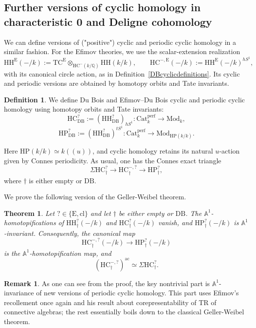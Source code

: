 \documentclass{amsart}
\theoremstyle{plain}
\newtheorem{theorem}[prop]{Theorem}
\theoremstyle{definition}
\newtheorem{defi}[prop]{Definition}
\newtheorem{remark}[prop]{Remark}
\newcommand{\bbA}{\mathbb{A}}
\newcommand{\bbQ}{\mathbb{Q}}
\newcommand{\Catperf}{\mathrm{Cat}^{\mathrm{perf}}}
\newcommand{\TC}{\mathrm{TC}}
\newcommand{\HH}{\mathrm{HH}}
\newcommand{\HC}{\mathrm{HC}}
\newcommand{\HP}{\mathrm{HP}}
\newcommand{\Mod}{\mathrm{Mod}}
\newcommand{\DB}{\mathrm{DB}}
\newcommand{\cl}{\mathrm{cl}}
\begin{document}
\subsection{Further versions of cyclic homology in characteristic 0 and Deligne cohomology}\label{seccyclicDeligne}

We can define versions of ("positive") cyclic and periodic cyclic homology in a similar fashion.
For the Efimov theories, we use the scalar-extension realization
\[
\HH^{\mathrm{E}}(-/k):=\TC^{\mathrm{E}}\otimes_{\HC^-(k/\bbQ)}\HH(k/k),
\qquad \HC^{-,\mathrm{E}}(-/k):=\HH^{\mathrm{E}}(-/k)^{hS^1},
\]
with its canonical circle action, as in Definition~\ref{DBcyclicdefinitions}. Its cyclic and periodic versions are obtained by homotopy orbits and Tate invariants.

\begin{defi}\label{HCHPDBdefi}
We define Du Bois and Efimov--Du Bois cyclic and periodic cyclic homology using homotopy orbits and Tate invariants:
\[
\HC^?_{\DB}:=(\HH^?_{\DB})_{hS^1}:
\Catperf_k\longrightarrow\Mod_k,
\]
\[
\HP^?_{\DB}:=(\HH^?_{\DB})^{tS^1}:
\Catperf_k\longrightarrow\Mod_{\HP(k/k)}.
\]
\end{defi}

Here $\HP(k/k)\simeq k((u))$, and cyclic homology retains its natural
$u$-action given by Connes periodicity. As usual, one has the Connes exact triangle
\begin{equation}\label{ConnesDB}
\Sigma \HC^?_\dagger\longrightarrow \HC^{-,?}_\dagger
\longrightarrow \HP^?_\dagger,
\end{equation}
where $\dagger$ is either empty or $\DB$.

We prove the following version of the Geller-Weibel theorem.

\begin{theorem}\label{char0GW}\label{char0cyclictriangle}
Let $?\in\{\mathrm{E},\cl\}$ and let $\dagger$ be either empty or $\DB$.
The $\bbA^1$-homotopifications of $\HH^?_\dagger(-/k)$ and
$\HC^?_\dagger(-/k)$ vanish, and $\HP^?_\dagger(-/k)$ is
$\bbA^1$-invariant. Consequently, the canonical map
\[
\HC^{-,?}_\dagger(-/k)\longrightarrow \HP^?_\dagger(-/k)
\]
is the $\bbA^1$-homotopification map, and
\[
(\HC^{-,?}_\dagger)^{\mathrm{ac}}\simeq\Sigma \HC^?_\dagger.
\]
\end{theorem}

\begin{remark}
    As one can see from the proof, the key nontrivial part is $\bbA^1$-invariance of new versions of periodic cyclic homology. This part uses Efimov's recollement once again and his result about corepresentability of TR of connective algebras; the rest essentially boils down to the classical Geller-Weibel theorem.
\end{remark}
\end{document}
